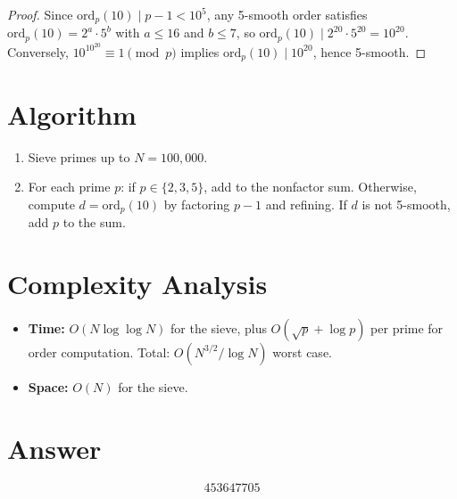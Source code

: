 \documentclass[12pt]{article}
\begin{document}
\begin{proof}
Since $\mathrm{ord}_p(10) \mid p - 1 < 10^5$, any 5-smooth order satisfies $\mathrm{ord}_p(10) = 2^a \cdot 5^b$ with $a \leq 16$ and $b \leq 7$, so $\mathrm{ord}_p(10) \mid 2^{20} \cdot 5^{20} = 10^{20}$. Conversely, $10^{10^{20}} \equiv 1 \pmod{p}$ implies $\mathrm{ord}_p(10) \mid 10^{20}$, hence 5-smooth.
\end{proof}

\section{Algorithm}
\begin{enumerate}
    \item Sieve primes up to $N = 100{,}000$.
    \item For each prime $p$: if $p \in \{2, 3, 5\}$, add to the nonfactor sum. Otherwise, compute $d = \mathrm{ord}_p(10)$ by factoring $p - 1$ and refining. If $d$ is not 5-smooth, add $p$ to the sum.
\end{enumerate}

\section{Complexity Analysis}
\begin{itemize}
    \item \textbf{Time:} $O(N \log\log N)$ for the sieve, plus $O(\sqrt{p} + \log p)$ per prime for order computation. Total: $O(N^{3/2} / \log N)$ worst case.
    \item \textbf{Space:} $O(N)$ for the sieve.
\end{itemize}

\section{Answer}

\[
\boxed{453647705}
\]
\end{document}

